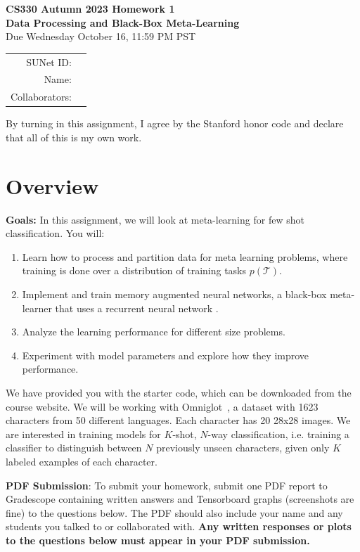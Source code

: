 \documentclass[12pt]{article}
\begin{document}
\begin{center}
{\Large \textbf{CS330 Autumn 2023 Homework 1 \\ Data Processing and Black-Box Meta-Learning}}
\\ {\large Due Wednesday October 16, 11:59 PM PST}

\begin{tabular}{rl}
SUNet ID: &  \\
Name: & \\
Collaborators: & 
\end{tabular}
\end{center}

By turning in this assignment, I agree by the Stanford honor code and declare
that all of this is my own work.

\section*{Overview}

\textbf{Goals:} In this assignment, we will look at meta-learning for few shot classification. You will:
\begin{enumerate}
    \item Learn how to process and partition data for meta learning problems, where training is done over a distribution of training tasks $p(\mathcal{T})$.
    \item Implement and train memory augmented neural networks, a black-box meta-learner that uses a recurrent neural network \cite{pmlr-v48-santoro16}.
    \item Analyze the learning performance for different size problems.
    \item Experiment with model parameters and explore how they improve performance.
\end{enumerate}

We have provided you with the starter code, which can be downloaded from the course website. We will be working with Omniglot~\cite{Lake1332}, a dataset with 1623 characters from 50 different languages. Each character has 20 28x28 images.
We are interested in training models for $K$-shot, $N$-way classification, i.e. training a classifier to distinguish between $N$ previously unseen characters, given only $K$ labeled examples of each character.

\vspace{0.2cm}
\noindent\textbf{PDF Submission}: To submit your homework, submit one PDF report to Gradescope containing written answers and Tensorboard graphs (screenshots are fine) to the questions below. The PDF should also include your name and any students you talked to or collaborated with. \textbf{Any written responses or plots to the questions below must appear in your PDF submission.} 
\end{document}
